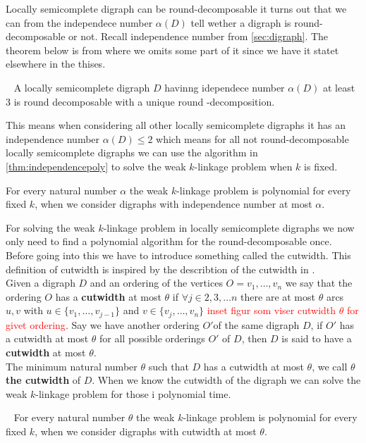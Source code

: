 Locally semicomplete digraph can be round-decomposable it turns out that we can from the independece number $\alpha (D)$ tell wether a digraph is round-decomposable or not.
Recall independence number from \autoref{sec:digraph}. The theorem below is from \cite{bangJGT77} where we omits some part of it since we have it statet elsewhere in the thises.
\begin{thm}~\cite{bangJGT77}
    A locally semicomplete digraph $D$ havinng idependece number $\alpha (D)$ at least 3 is round decomposable with a unique round -decomposition. 
    \label{thm:independenceround}
\end{thm} 
This means when considering all other locally semicomplete digraphs it has an independence number $\alpha (D) \leq 2$ which means for all not round-decomposable locally semicomplete digraphs we can use the algorithm in \autoref{thm:independencepoly} to solve the weak $k$-linkage problem when $k$ is fixed.
\begin{thm}
        For every natural number $\alpha$ the weak $k$-linkage problem is polynomial for every fixed $k$, when we consider digraphs with independence number at most $\alpha$.
    \label{thm:independencepoly} 
\end{thm}
For solving the weak $k$-linkage problem in locally semicomplete digraphs we now only need to find a polynomial algorithm for the round-decomposable once.
Before going into this we have to introduce something called the cutwidth. This definition of cutwidth is inspired by the describtion of the cutwidth in \cite{bangJGT77}.\\
Given a digraph $D$ and an ordering of the vertices $O=v_1,\dots,v_n$ we say that the ordering $O$ has a \textbf{cutwidth} at most $\theta$ if $\forall j\in {2,3, \dots n}$ there are at most $\theta$ arcs $u,v$ with $u\in \lbrace v_1,\dots ,v_{j-1}\rbrace$ and $v\in \lbrace v_j,\dots ,v_n\rbrace$ 
\textcolor{red}{inset figur som viser cutwidth $\theta$ for givet ordering}.
Say we have another ordering $O'$of the same digraph $D$, if $O'$ has a cutwidth at most $\theta$ for all possible orderings $O'$ of $D$, then $D$ is said to have a \textbf{cutwidth} at most $\theta$. \\
The minimum natural number $\theta$ such that $D$ has a cutwidth at most $\theta$, we call $\theta$ \textbf{the cutwidth} of $D$.
When we know the cutwidth of the digraph we can solve the weak $k$-linkage problem for those i polynomial time.
\begin{thm}~\cite{bangJGT77}
    For every natural number $\theta$ the weak $k$-linkage problem is polynomial for every fixed $k$, when we consider digraphs with cutwidth at most $\theta$.
    \label{thm:cutwidthklink}
\end{thm}
